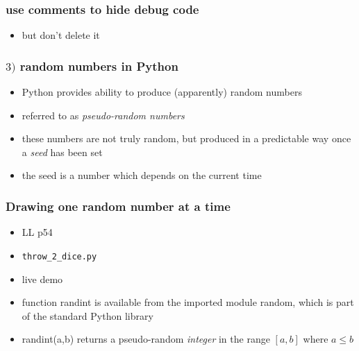 \documentclass[14pt]{beamer}
\newcommand\red[1]{{\color{red} #1}}
\begin{document}

\begin{frame}[fragile]

\frametitle{use comments to hide debug code}

\begin{itemize}
	\item but don't delete it
\end{itemize}

\end{frame}


\begin{frame}[fragile]

\frametitle{$3)$ random numbers in Python}

\begin{itemize}
	\item Python provides ability to produce (apparently) random numbers
	\item referred to as \red{\emph{pseudo-random numbers}}
	\item these numbers are not truly random, but produced in a predictable way once a \red{\emph{seed}} has been set
	\item the seed is a number which depends on the current time
		
\end{itemize}



\end{frame}


\begin{frame}[fragile]

\frametitle{Drawing \textbf{one} random number at a time}

\begin{itemize}
	\item LL p54
	\item \verb+throw_2_dice.py+
	\item live demo
	\item function randint is available from the imported module random, which is part of the standard Python library
	\item randint(a,b) returns a pseudo-random \emph{integer} in the range $[a,b]$ where $a \leq b$
\end{itemize}

\end{frame}
\end{document}
